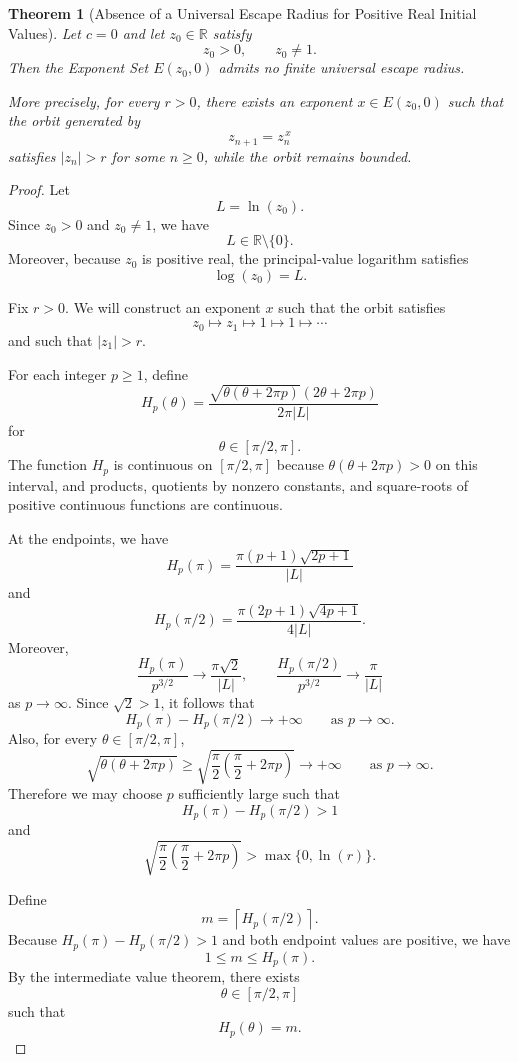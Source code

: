 \documentclass[12pt,a4paper]{amsart}
\newtheorem{theorem}{Theorem}[section]
\theoremstyle{remark}
\newcommand{\R}{\mathbb{R}}
\begin{document}
\medskip

\begin{theorem}[Absence of a Universal Escape Radius for Positive Real Initial Values]
\label{thm:no-universal-radius-positive-real}
Let $c=0$ and let $z_0\in\R$ satisfy
\[
z_0>0,
\qquad
z_0\ne 1.
\]
Then the Exponent Set $E(z_0,0)$ admits no finite universal escape radius.

More precisely, for every $r>0$, there exists an exponent $x\in E(z_0,0)$
such that the orbit generated by
\[
z_{n+1}=z_n^{\,x}
\]
satisfies $|z_n|>r$ for some $n\ge 0$, while the orbit remains bounded.
\end{theorem}

\begin{proof}
Let
\[
L=\ln(z_0).
\]
Since $z_0>0$ and $z_0\ne 1$, we have
\[
L\in\R\setminus\{0\}.
\]
Moreover, because $z_0$ is positive real, the principal-value logarithm satisfies
\[
\log(z_0)=L.
\]

Fix $r>0$. We will construct an exponent $x$ such that the orbit satisfies
\[
z_0\mapsto z_1\mapsto 1\mapsto 1\mapsto \cdots
\]
and such that $|z_1|>r$.

For each integer $p\ge 1$, define
\[
H_p(\theta)
=
\frac{\sqrt{\theta(\theta+2\pi p)}(2\theta+2\pi p)}
{2\pi |L|}
\]
for
\[
\theta\in[\pi/2,\pi].
\]
The function $H_p$ is continuous on $[\pi/2,\pi]$ because
$\theta(\theta+2\pi p)>0$ on this interval, and products, quotients by
nonzero constants, and square-roots of positive continuous functions are
continuous.

At the endpoints, we have
\[
H_p(\pi)
=
\frac{\pi(p+1)\sqrt{2p+1}}{|L|}
\]
and
\[
H_p(\pi/2)
=
\frac{\pi(2p+1)\sqrt{4p+1}}{4|L|}.
\]
Moreover,
\[
\frac{H_p(\pi)}{p^{3/2}}
\to
\frac{\pi\sqrt{2}}{|L|},
\qquad
\frac{H_p(\pi/2)}{p^{3/2}}
\to
\frac{\pi}{|L|}
\]
as $p\to\infty$. Since $\sqrt{2}>1$, it follows that
\[
H_p(\pi)-H_p(\pi/2)\to+\infty
\qquad\text{as }p\to\infty.
\]
Also, for every $\theta\in[\pi/2,\pi]$,
\[
\sqrt{\theta(\theta+2\pi p)}
\ge
\sqrt{\frac{\pi}{2}(\frac{\pi}{2}+2\pi p)}
\to+\infty
\qquad\text{as }p\to\infty.
\]
Therefore we may choose $p$ sufficiently large such that
\[
H_p(\pi)-H_p(\pi/2)>1
\]
and
\[
\sqrt{\frac{\pi}{2}(\frac{\pi}{2}+2\pi p)}
>
\max\{0,\ln(r)\}.
\]

Define
\[
m=\left\lceil H_p(\pi/2)\right\rceil.
\]
Because $H_p(\pi)-H_p(\pi/2)>1$ and both endpoint values are positive, we
have
\[
1\le m\le H_p(\pi).
\]
By the intermediate value theorem, there exists
\[
\theta\in[\pi/2,\pi]
\]
such that
\[
H_p(\theta)=m.
\]


\end{proof}
\end{document}
